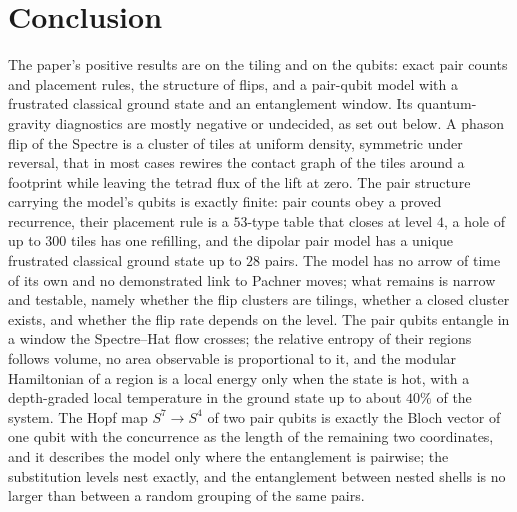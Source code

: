 \documentclass[11pt]{article}
\theoremstyle{definition}
\begin{document}
\section{Conclusion}
The paper's positive results are on the tiling and on the qubits: exact pair counts and placement rules, the structure of flips, and a pair-qubit model with a frustrated classical ground state and an entanglement window. Its quantum-gravity diagnostics are mostly negative or undecided, as set out below. A phason flip of the Spectre is a cluster of tiles at uniform density, symmetric under reversal, that in most cases rewires the contact graph of the tiles around a footprint while leaving the tetrad flux of the lift at zero. The pair structure carrying the model's qubits is exactly finite: pair counts obey a proved recurrence, their placement rule is a $53$-type table that closes at level $4$, a hole of up to $300$ tiles has one refilling, and the dipolar pair model has a unique frustrated classical ground state up to $28$ pairs. The model has no arrow of time of its own and no demonstrated link to Pachner moves; what remains is narrow and testable, namely whether the flip clusters are tilings, whether a closed cluster exists, and whether the flip rate depends on the level. The pair qubits entangle in a window the Spectre--Hat flow crosses; the relative entropy of their regions follows volume, no area observable is proportional to it, and the modular Hamiltonian of a region is a local energy only when the state is hot, with a depth-graded local temperature in the ground state up to about $40\%$ of the system. The Hopf map $S^7\to S^4$ of two pair qubits is exactly the Bloch vector of one qubit with the concurrence as the length of the remaining two coordinates, and it describes the model only where the entanglement is pairwise; the substitution levels nest exactly, and the entanglement between nested shells is no larger than between a random grouping of the same pairs.
\appendix
\end{document}
